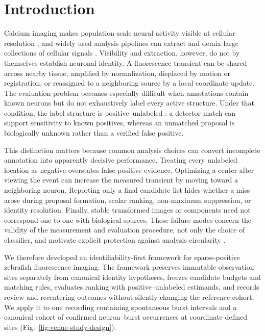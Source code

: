 \section{Introduction}

Calcium imaging makes population-scale neural activity visible at cellular
resolution \citep{ahrens2013wholebrain}, and widely used analysis pipelines can
extract and demix large collections of cellular signals
\citep{mukamel2009automated,pnevmatikakis2016simultaneous,giovannucci2019caiman}.
Visibility and extraction, however, do not by themselves establish neuronal
identity. A fluorescence transient can be
shared across nearby tissue, amplified by normalization, displaced by motion or
registration, or reassigned to a neighboring source by a local coordinate
update. The evaluation problem becomes especially difficult when annotations
contain known neurons but do not exhaustively label every active structure.
Under that condition, the label structure is positive--unlabeled
\citep{bekker2020pu}: a detector match can support sensitivity to known
positives, whereas an unmatched proposal is biologically unknown rather than a
verified false positive.

This distinction matters because common analysis choices can convert incomplete
annotation into apparently decisive performance. Treating every unlabeled
location as negative overstates false-positive evidence. Optimizing a center
after viewing the event can increase the measured transient by moving toward a
neighboring neuron. Reporting only a final candidate list hides whether a miss
arose during proposal formation, scalar ranking, non-maximum suppression, or
identity resolution. Finally, stable transformed images or components need not
correspond one-to-one with biological sources. These failure modes concern the
validity of the measurement and evaluation procedure, not only the choice of
classifier, and motivate explicit protection against analysis circularity
\citep{kriegeskorte2009circular}.

We therefore developed an identifiability-first framework for sparse-positive
zebrafish fluorescence imaging. The framework preserves immutable observation
sites separately from canonical identity hypotheses, freezes candidate budgets
and matching rules, evaluates ranking with positive--unlabeled estimands, and
records review and recentering outcomes without silently changing the reference
cohort. We apply it to one recording containing \VenueCohortBursts{}
spontaneous burst intervals and a canonical cohort of
\VenueCohortOccurrences{} confirmed neuron--burst occurrences at
\VenueCohortSites{} coordinate-defined sites
(Fig.~\ref{fig:venue-study-design}).

